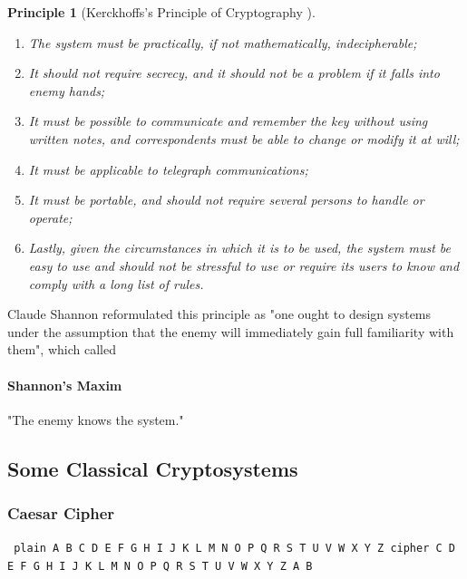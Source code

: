 \documentclass{article}
\newtheorem{principle}[theorem]{Principle}
\begin{document}
\begin{principle}[Kerckhoffs's Principle of Cryptography \cite{Kerckhoffs_1883}]
    \mbox{}\\
    \begin{enumerate}
        \item The system must be practically, if not mathematically, indecipherable;
        \item It should not require secrecy, and it should not be a problem if it falls into enemy hands;
        \item It must be possible to communicate and remember the key without using written notes, and correspondents must be able to change or modify it at will;
        \item It must be applicable to telegraph communications;
        \item It must be portable, and should not require several persons to handle or operate;
        \item Lastly, given the circumstances in which it is to be used, the system must be easy to use and should not be stressful to use or require its users to know and comply with a long list of rules.
    \end{enumerate}
\end{principle}

Claude Shannon reformulated this principle as "one ought to design systems under the assumption that the enemy will immediately gain full familiarity with them", which called

\paragraph{Shannon's Maxim} "The enemy knows the system."

\subsection{Some Classical Cryptosystems}

\subsubsection{Caesar Cipher}

{\tt
\obeylines\obeyspaces
    plain   A B C D E F G H I J K L M N O P Q R S T U V W X Y Z
    cipher  C D E F G H I J K L M N O P Q R S T U V W X Y Z A B
}

\newpage



\end{document}
